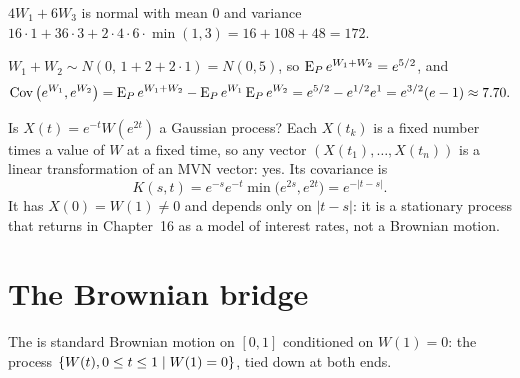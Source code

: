 \begin{example}
\label{ex:4w1-6w3}
$4W_1+6W_3$ is normal with mean $0$ and variance $16\cdot1+36\cdot3+2\cdot4\cdot6\cdot\min(1,3)=16+108+48=172$.
\end{example}

\begin{example}
\label{ex:cov-exp}
$W_1+W_2\sim N(0,\,1+2+2\cdot1)=N(0,5)$, so $\operatorname{E}_Pe^{W_1+W_2}=e^{5/2}$, and
\[
  \operatorname{Cov}\big(e^{W_1},e^{W_2}\big)=\operatorname{E}_Pe^{W_1+W_2}-\operatorname{E}_Pe^{W_1}\operatorname{E}_Pe^{W_2}=e^{5/2}-e^{1/2}e^{1}=e^{3/2}(e-1)\approx7.70 .
\]
\end{example}

\begin{example}
\label{ex:time-change}
Is $X(t)=e^{-t}W(e^{2t})$ a Gaussian process? Each $X(t_k)$ is a fixed number times a value of $W$ at a fixed time, so any vector $(X(t_1),\dots,X(t_n))$ is a linear transformation of an MVN vector: yes. Its covariance is
\[
  K(s,t)=e^{-s}e^{-t}\min\big(e^{2s},e^{2t}\big)=e^{-|t-s|} .
\]
It has $X(0)=W(1)\ne0$ and depends only on $|t-s|$: it is a stationary process that returns in Chapter~16 as a model of interest rates, not a Brownian motion.
\end{example}

\section{The Brownian bridge}

\begin{definition}
The  is standard Brownian motion on $[0,1]$ conditioned on $W(1)=0$: the process $\{W(t),0\le t\le1\mid W(1)=0\}$, tied down at both ends.
\end{definition}

